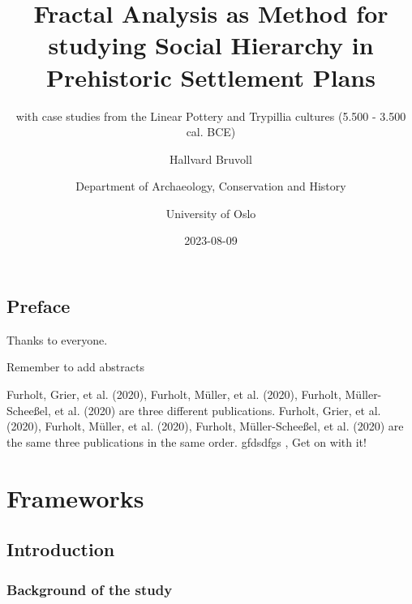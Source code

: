 \documentclass[
  12pt,
]{book}
\title{Fractal Analysis as Method for studying Social Hierarchy in Prehistoric Settlement Plans}
\subtitle{with case studies from the Linear Pottery and Trypillia cultures (5.500 - 3.500 cal. BCE)}
\author{Hallvard Bruvoll \and Department of Archaeology, Conservation and History \and University of Oslo}
\date{2023-08-09}
\begin{document}
\maketitle

{
\setcounter{tocdepth}{2}
\tableofcontents
}
\hypertarget{preface}{%
\chapter*{Preface}\label{preface}}

Thanks to everyone.

Remember to add abstracts

Furholt, Grier, et al. (2020), Furholt, Müller, et al. (2020), Furholt, Müller-Scheeßel, et al. (2020) are three different publications. Furholt, Grier, et al. (2020), Furholt, Müller, et al. (2020), Furholt, Müller-Scheeßel, et al. (2020) are the same three publications in the same order. gfdsdfgs , Get on with it!

\hypertarget{part-frameworks}{%
\part{Frameworks}\label{part-frameworks}}

\hypertarget{intro}{%
\chapter{Introduction}\label{intro}}

\hypertarget{background-of-the-study}{%
\section{Background of the study}\label{background-of-the-study}}
\end{document}
